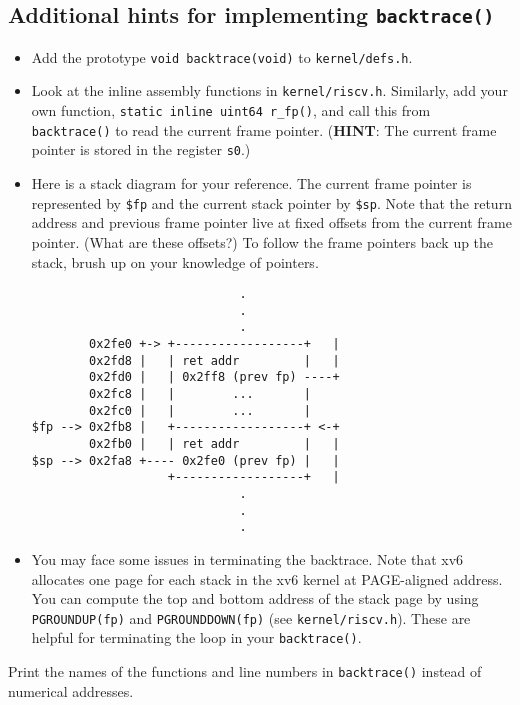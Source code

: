 \documentclass[11pt]{exam}
\begin{document}
\begin{questions}
\begin{parts}
\begin{solution}
	

\end{solution}

\end{parts}

\subsection*{Additional hints for implementing \texttt{backtrace()}}

\begin{itemize}
    \item Add the prototype \texttt{void backtrace(void)} to {\tt kernel/defs.h}.
    \item Look at the inline assembly functions in {\tt kernel/riscv.h}. Similarly, add your own function, \texttt{static inline uint64 r\_fp()}, and call this from {\tt backtrace()} to read the current frame pointer. (\textbf{HINT}: The current frame pointer is stored in the register \texttt{s0}.)
    \item Here is a stack diagram for your reference. The current frame pointer is represented by \texttt{\$fp} and the current stack pointer by \texttt{\$sp}. Note that the return address and previous frame pointer live at fixed offsets from the current frame pointer. (What are these offsets?) To follow the frame pointers back up the stack, brush up on your knowledge of pointers.
    \begin{verbatim}
                             .
                             .
                             .
        0x2fe0 +-> +------------------+   |
        0x2fd8 |   | ret addr         |   |
        0x2fd0 |   | 0x2ff8 (prev fp) ----+
        0x2fc8 |   |        ...       |
        0x2fc0 |   |        ...       |
$fp --> 0x2fb8 |   +------------------+ <-+
        0x2fb0 |   | ret addr         |   |
$sp --> 0x2fa8 +---- 0x2fe0 (prev fp) |   |
                   +------------------+   |
                             .
                             .
                             .
    \end{verbatim}
    \item You may face some issues in terminating the backtrace. Note that xv6 allocates one page for each stack in the xv6 kernel at PAGE-aligned address. You can compute the top and bottom address of the stack page by using {\tt PGROUNDUP(fp)} and {\tt PGROUNDDOWN(fp)} (see {\tt kernel/riscv.h}). These are helpful for terminating the loop in your \texttt{backtrace()}.
\end{itemize}


\question[30] {\bf [OPTIONAL]} Print the names of the functions and line numbers in {\tt backtrace()} instead of numerical addresses.


\end{questions}
\end{document}
